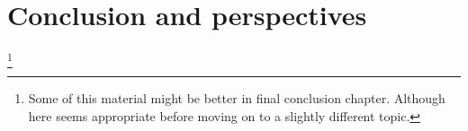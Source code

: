 %
%
%
%
%
%

\section{Conclusion and perspectives}
\label{sec:vir_conclusion}
\footnote{Some of this material might be better in final conclusion chapter. Although here seems appropriate before moving on to a slightly different topic.}

